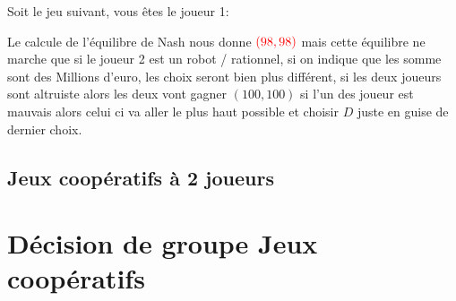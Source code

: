 Soit le jeu suivant, vous êtes le joueur 1:
\begin{center}
\end{center}
Le calcule de l'équilibre de Nash nous donne $\textcolor{red}{(98,98)}$ mais cette équilibre ne marche que si le joueur 2 est un robot / rationnel, si on indique que les somme sont des Millions d'euro, les choix seront bien plus différent, si les deux joueurs sont altruiste alors les deux vont gagner $(100,100)$ si l'un des joueur est mauvais alors celui ci va aller le plus haut possible et choisir $D$ juste en guise de dernier choix.\\

\pagebreak
\section{Jeux coopératifs à 2 joueurs}


\pagebreak
\chapter{Décision de groupe Jeux coopératifs}

\pagebreak